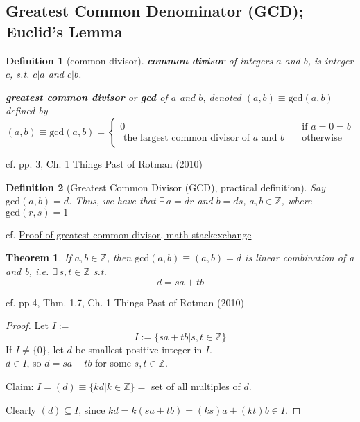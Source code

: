 \documentclass[10pt]{amsart}
\newtheorem{theorem}{Theorem}
\newtheorem{definition}{Definition}
\begin{document}
\begin{multicols*}{2}
\subsection{Greatest Common Denominator (GCD); Euclid's Lemma}

\begin{definition}[common divisor]
	\textbf{common divisor} of integers $a$ and $b$, is integer $c$, s.t. $ c | a$ \emph{and} $c|b$.  

\textbf{greatest common divisor} or \textbf{gcd} of $a$ and $b$, denoted $(a,b) \equiv \text{gcd}(a,b)$ defined by 
\[
(a,b) \equiv \text{gcd}(a,b) = \begin{cases} 0 & \text{ if } a = 0 = b \\ 
 \text{ the largest common divisor of $a$ and $b$ } & \text{ otherwise } \end{cases}  
\]
	\end{definition} 
cf. pp. 3, Ch. 1 Things Past of Rotman (2010) \cite{JRotman2010}  

\begin{definition}[Greatest Common Divisor (GCD), practical definition]
Say $\text{gcd}(a, b) = d$. Thus, we have that $\exists \,  a = dr$ and $b = ds$, $a, b\in \mathbb{Z}$, where $\text{gcd}(r, s) = 1$
\end{definition}
cf. \href{https://math.stackexchange.com/questions/1535408/proof-of-greatest-common-divisor}{Proof of greatest common divisor, math stackexchange}


\begin{theorem}\label{Thm:lincombgcd}
	If $a,b\in \mathbb{Z}$, then $\text{gcd}(a,b) \equiv (a,b)=d$ is linear combination of a and b, i.e. $\exists \, s,t \in \mathbb{Z}$ s.t.
\begin{equation}
d= sa + tb
\end{equation}
\end{theorem}
cf. pp.4, Thm. 1.7, Ch. 1 Things Past of Rotman (2010) \cite{JRotman2010}

\begin{proof}
Let $I:=$ 
\[
I :=\lbrace sa+tb|s,t\in \mathbb{Z} \rbrace
\]
If $I\neq \lbrace 0 \rbrace$, let $d$ be smallest positive integer in $I$.   \\
$d\in I$, so $d=sa + tb$ for some $s,t\in \mathbb{Z}$.  

Claim: $I=(d) \equiv \lbrace kd| k\in \mathbb{Z} \rbrace = $ set of all multiples of $d$.  

Clearly $(d)\subseteq I$, since $kd=k(sa+tb) = (ks)a+(kt)b\in I$.  


\end{proof}
\end{multicols*}
\end{document}
